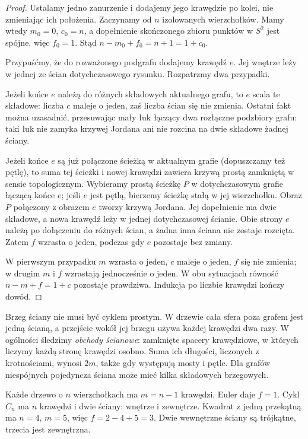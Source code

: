 \begin{proof}
Ustalamy jedno zanurzenie i dodajemy jego krawędzie po kolei,
nie zmieniając ich położenia. Zaczynamy od $n$ izolowanych
wierzchołków. Mamy wtedy $m_0=0$, $c_0=n$, a dopełnienie
skończonego zbioru punktów w $S^2$ jest spójne, więc $f_0=1$.
Stąd $n-m_0+f_0=n+1=1+c_0$.

Przypuśćmy, że do rozważonego podgrafu dodajemy krawędź $e$.
Jej wnętrze leży w jednej ze ścian dotychczasowego rysunku.
Rozpatrzmy dwa przypadki.

Jeżeli końce $e$ należą do różnych składowych aktualnego grafu,
to $e$ scala te składowe: liczba $c$ maleje o jeden,
zaś liczba ścian się nie zmienia. Ostatni fakt można
uzasadnić, przesuwając mały łuk łączący dwa rozłączne
podzbiory grafu: taki łuk nie zamyka krzywej Jordana
ani nie rozcina na dwie składowe żadnej ściany.

Jeżeli końce $e$ są już połączone ścieżką w aktualnym
grafie (dopuszczamy też pętlę), to suma tej ścieżki
i nowej krawędzi zawiera krzywą prostą zamkniętą
w sensie topologicznym. Wybieramy prostą ścieżkę $P$ w dotychczasowym grafie
łączącą końce $e$; jeśli $e$ jest pętlą, bierzemy ścieżkę
stałą w jej wierzchołku. Obraz $P$ połączony z obrazem
$e$ tworzy krzywą Jordana. Jej dopełnienie ma dwie składowe,
a nowa krawędź leży w jednej dotychczasowej ścianie.
Obie strony $e$ należą po dołączeniu do różnych ścian,
a żadna inna ściana nie zostaje rozcięta. Zatem $f$ wzrasta
o jeden, podczas gdy $c$ pozostaje bez zmiany.

W pierwszym przypadku $m$ wzrasta o jeden, $c$ maleje
o jeden, $f$ się nie zmienia; w drugim $m$ i $f$
wzrastają jednocześnie o jeden. W obu sytuacjach
równość $n-m+f=1+c$ pozostaje prawdziwa. Indukcja
po liczbie krawędzi kończy dowód.
\end{proof}

\begin{uwaga}
Brzeg ściany nie musi być cyklem prostym. W drzewie
cała sfera poza grafem jest jedną ścianą, a przejście
wokół jej brzegu używa każdej krawędzi dwa razy.
W ogólności śledzimy \emph{obchody ścianowe}: zamknięte
spacery krawędziowe, w których liczymy każdą stronę
krawędzi osobno. Suma ich długości, liczonych z krotnościami,
wynosi $2m$, także gdy występują mosty i pętle.
Dla grafów niespójnych pojedyncza ściana może mieć kilka
składowych brzegowych.
\end{uwaga}

\begin{przyklad}
Każde drzewo o $n$ wierzchołkach ma $m=n-1$ krawędzi.
Euler daje $f=1$. Cykl $C_n$ ma $n$ krawędzi i dwie ściany:
wnętrze i zewnętrze. Kwadrat z jedną przekątną ma
$n=4$, $m=5$, więc $f=2-4+5=3$.
Dwie wewnętrzne ściany są trójkątne, trzecia jest zewnętrzna.
\end{przyklad}

